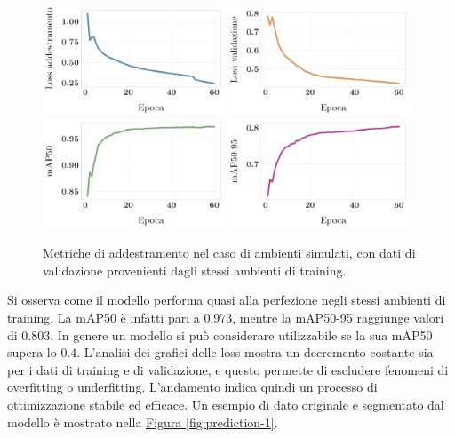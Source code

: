 \documentclass[12pt]{report}
\begin{document}
\begin{figure}[h!]
	\centering
	{\includegraphics[width=0.48\textwidth]{images/domain-shift/sim-to-sim/1/train-loss}}
	\hspace{0.01\textwidth}
	{\includegraphics[width=0.48\textwidth]{images/domain-shift/sim-to-sim/1/validation-loss}}
	\hspace{0.01\textwidth}
	\\
	{\includegraphics[width=0.48\textwidth]{images/domain-shift/sim-to-sim/1/map50}}
	\hspace{0.01\textwidth}
	{\includegraphics[width=0.48\textwidth]{images/domain-shift/sim-to-sim/1/map50-95}}
	\caption{Metriche di addestramento nel caso di ambienti simulati, con dati di validazione provenienti dagli stessi ambienti di training.}
	\label{fig:training-1}
\end{figure}

Si osserva come il modello performa quasi alla perfezione negli stessi ambienti di training. La mAP50 è infatti pari a 0.973, mentre la mAP50-95 raggiunge valori di 0.803. In genere un modello si può considerare utilizzabile se la sua mAP50 supera lo 0.4. L'analisi dei grafici delle loss mostra un decremento costante sia per i dati di training e di validazione, e questo permette di escludere fenomeni di overfitting o underfitting. L'andamento indica quindi un processo di ottimizzazione stabile ed efficace. Un esempio di dato originale e segmentato dal modello è mostrato nella \hyperref[fig:prediction-1]{Figura \ref{fig:prediction-1}}.
\end{document}
